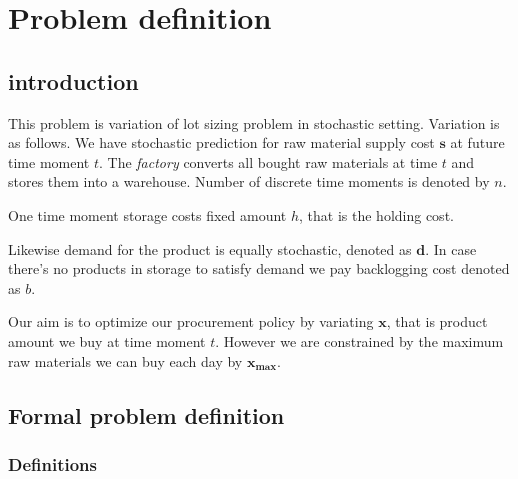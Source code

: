 
\chapter{Problem definition}
\section{introduction}

This problem is variation of lot sizing problem in stochastic setting. Variation is as follows. We have stochastic prediction for raw material supply cost $\mathbf{s}$ at future time moment $t$. The \emph{factory} converts all bought raw materials at time $t$ and stores them into a warehouse. Number of discrete time moments is denoted by $n$.

One time moment storage costs fixed amount $h$, that is the holding cost.

Likewise demand for the product is equally stochastic, denoted as $\mathbf{d}$. In case there's no products in storage to satisfy demand we pay backlogging cost denoted as $b$.

Our aim is to optimize our procurement policy by variating $\mathbf{x}$, that is product amount we buy at time moment $t$. However we are constrained by the maximum raw materials we can buy each day by $\mathbf{x_{\text{max}}}$.

\section{Formal problem definition}
\label{sec:Formal problem definition}

\subsection{Definitions}
\label{sub:Definitions}

